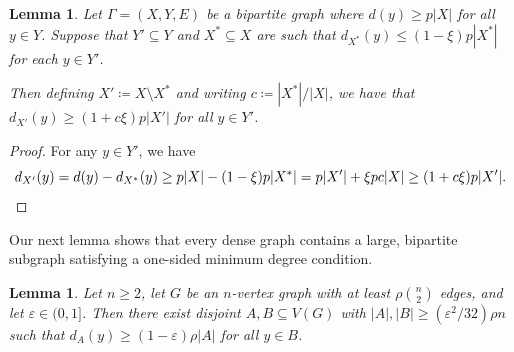 \documentclass{aic}
\theoremstyle{plain}
\newtheorem{lemma}[theorem]{Lemma}
\theoremstyle{remark}
\newcommand{\eps}{\ensuremath{\varepsilon}}
\newcommand\ab[1]{\lvert #1 \rvert}
\begin{document}
\begin{lemma}\label{lem:other increment}
    Let $\Gamma = (X,Y,E)$ be a bipartite graph where $d(y)\ge p|X|$ for all $y\in Y$. Suppose that $Y'\subseteq Y$ and $X^*\subseteq X$ are such that $d_{X^*}(y)\le (1-\xi)p|X^*|$ for each $y\in Y'$. 
    
    Then defining $X' \coloneqq X\setminus X^*$ and writing $c \coloneqq |X^*|/|X|$, we have that $d_{X'}(y)\ge (1+c\xi)p|X'|$ for all $y\in Y'$.  
\end{lemma}
\begin{proof}For any $y \in Y'$, we have
\[
d_{X'}(y) = d(y)-d_{X^*}(y) \ge p|X|-(1-\xi)p|X^*|= p|X'|+\xi p c|X| \ge (1+c\xi)p|X'|.\qedhere
\]
\end{proof}
Our next lemma shows that every dense graph contains a large, bipartite subgraph satisfying a one-sided minimum degree condition.
\begin{lemma}\label{lem:dense to bipartite}
    Let $n \geq 2$, let $G$ be an $n$-vertex graph with at least $\rho \binom n2$ edges, and let $\eps\in (0,1]$. Then there exist disjoint $A,B \subseteq V(G)$ with $\ab A, \ab B \geq (\eps^2/32)\rho n$ such that $d_A(y) \geq (1-\eps)\rho \ab A$ for all $y \in B$.
\end{lemma}
\end{document}
